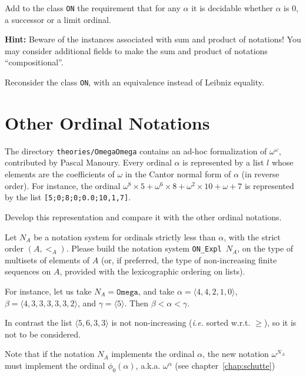 \begin{project}
\label{project:succ-limit-dec}
Add to the class \texttt{ON} the requirement that for any $\alpha$ it is decidable whether $\alpha$ is $0$, a successor or a limit ordinal.


\textbf{Hint:}   Beware of the instances associated with sum and product of notations!
  You may consider additional fields 
to make the sum and product of notations ``compositional''.

\end{project}

\begin{project}
\label{project:on-setoid}
Reconsider the  class \texttt{ON}, with an equivalence instead of Leibniz equality.
\end{project}






\section{Other Ordinal Notations}


\begin{project}
The directory \texttt{theories/OmegaOmega} contains an ad-hoc formalization of $\omega^\omega$, contributed by Pascal Manoury. Every ordinal $\alpha$ is represented by a list $l$ whose elements are the coefficients of $\omega$ in  the Cantor normal form of $\alpha$ (in reverse order). For instance, the ordinal 
$\omega^{8}\times 5 + \omega^{6}\times 8 + \omega^2\times 10 + \omega + 7$ is represented by the list \texttt{[5;0;8;0;0.0;10,1,7]}. 


 Develop this representation and compare it with the other ordinal notations.



\end{project}


\begin{project}
Let $N_A$ be a notation system for ordinals strictly less than $\alpha$, 
with the strict order $(A,<_A)$. Please build the notation system
\texttt{ON\_Expl $N_A$}, on the type of multisets of elements of $A$
(or, if preferred, the type of non-increasing finite sequences on $A$,
provided with the lexicographic ordering on lists).

For instance, let us take $N_A=\texttt{Omega}$, and take $\alpha=\langle 4,4,2,1,0\rangle$,
 $\beta=\langle 4,3,3,3,3,3,2\rangle$, and $\gamma=\langle 5\rangle$. Then $\beta<\alpha<\gamma$. 

In contrast the list $\langle5,6,3,3\rangle$ is not non-increasing (\emph{i.e.} sorted w.r.t. $\geq$), so it is not to be considered.

Note that if the notation $N_A$ implements the ordinal 
$\alpha$,  the new notation $\omega^{N_A}$ must implement the ordinal $\phi_0(\alpha)$, a.k.a. $\omega^\alpha$ (see chapter~\ref{chap:schutte})

\end{project}



